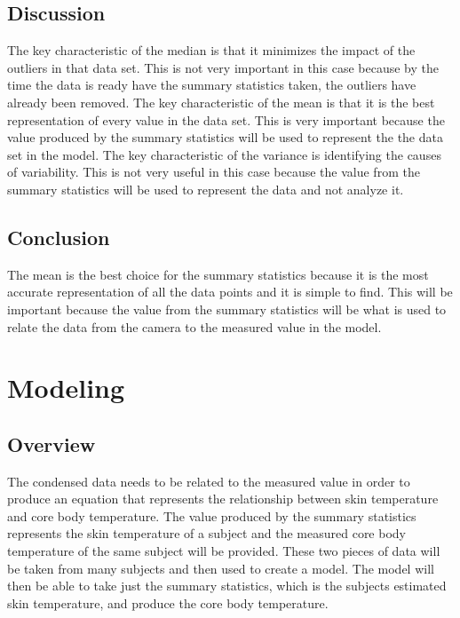 \documentclass[onecolumn, draftclsnofoot,10pt, compsoc]{IEEEtran}
\begin{document}
		\subsection{Discussion}
		
		The key characteristic of the median is that it minimizes the impact of the outliers in that data set. This is not very important in this case because by the time the data is ready have the summary statistics taken, the outliers have already been removed. The key characteristic of the mean is that it is the best representation of every value in the data set. This is very important because the value produced by the summary statistics will be used to represent the the data set in the model. The key characteristic of the variance is identifying the causes of variability. This is not very useful in this case because the value from the summary statistics will be used to represent the data and not analyze it.
	    

		\subsection{Conclusion}
		
		The mean is the best choice for the summary statistics because it is the most accurate representation of all the data points and it is simple to find. This will be important because the value from the summary statistics will be what is used to relate the data from the camera to the measured value in the model.

	\section{Modeling}
	
		\subsection{Overview}
		The condensed data needs to be related to the measured value in order to produce an equation that represents the relationship between skin temperature and core body temperature. The value produced by the summary statistics represents the skin temperature of a subject and the measured core body temperature of the same subject will be provided. These two pieces of data will be taken from many subjects and then used to create a model. The model will then be able to take just the summary statistics, which is the subjects estimated skin temperature, and produce the core body temperature.
\end{document}
